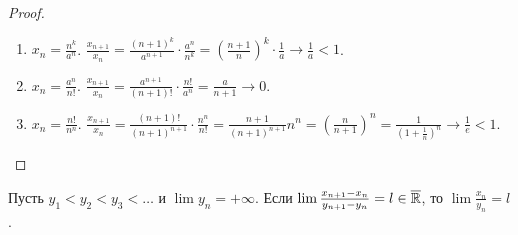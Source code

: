\begin{proof}
    \slashn
    \begin{enumerate}
        \item $x_n = \frac{n^k}{a^n}$. $\frac{x_{n+1}}{x_n} = \frac{(n+1)^k}{a^{n+1}} \cdot \frac{a^n}{n^k} = \left(\frac{n+1} {n}\right)^k \cdot \frac{1}{a} \to \frac{1}{a} < 1$.
        \item $x_n = \frac{a^n}{n!}$. $\frac{x_{n+1}}{x_n} = \frac{a^{n+1}}{(n+1)!} \cdot \frac{n!}{a^n} = \frac{a}{n+1} \to 0$.
        \item $x_n = \frac{n!}{n^n}$. $\frac{x_{n+1}}{x_n} = \frac{(n+1)!}{(n+1)^{n+1}} \cdot \frac{n^n}{n!} = \frac{n+1}{(n+1)^{n+1}} n^n = \left(\frac{n}{n+1}\right)^n = \frac{1}{\left(1+\frac{1}{n}\right)^n} \to \frac{1}{e} < 1$.
    \end{enumerate}
\end{proof}
\begin{theorem}
    Пусть $y_1 < y_2 < y_3 < \ldots$ и $\lim y_n = +\infty$. Если  $\lim \frac{x_{n+1}-x_n}{y_{n+1}-y_n} = l \in \overline{\mathbb{R}}$, то  $\lim \frac{x_n}{y_n} = l$.
\end{theorem}
